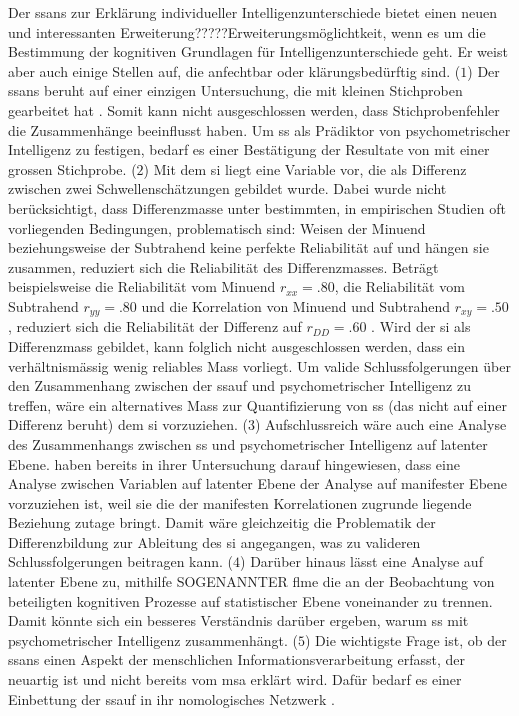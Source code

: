 \documentclass[11pt, twoside, a4paper]{book}		%
\begin{document}
Der \gls{ssans} zur Erklärung individueller Intelligenzunterschiede \citep{Melnick2013} bietet einen neuen und interessanten Erweiterung?????Erweiterungsmöglichtkeit, wenn es um die Bestimmung der kognitiven Grundlagen für Intelligenzunterschiede geht. Er weist aber auch einige Stellen auf, die anfechtbar oder klärungsbedürftig sind.
($1$) Der \gls{ssans} beruht auf einer einzigen Untersuchung, die mit kleinen Stichproben gearbeitet hat \citep[Studie 1: $N=12$ und Studie 2: $N=53$;][]{Melnick2013}. Somit kann nicht ausgeschlossen werden, dass Stichprobenfehler die Zusammenhänge beeinflusst haben. Um \gls{ss} als Prädiktor von psychometrischer Intelligenz zu festigen, bedarf es einer Bestätigung der Resultate von \citet{Melnick2013} mit einer grossen Stichprobe.
($2$) Mit dem \gls{si} liegt eine Variable vor, die als Differenz zwischen zwei Schwellenschätzungen gebildet wurde. Dabei wurde nicht berücksichtigt, dass Differenzmasse unter bestimmten, in empirischen Studien oft vorliegenden Bedingungen, problematisch sind: Weisen der Minuend  beziehungsweise der Subtrahend keine perfekte Reliabilität auf und hängen sie zusammen, reduziert sich die Reliabilität des Differenzmasses. Beträgt beispielsweise die Reliabilität vom Minuend $r_{xx} = .80$, die Reliabilität vom Subtrahend $r_{yy} = .80$ und die Korrelation von Minuend und Subtrahend $r_{xy} = .50$, reduziert sich die Reliabilität der Differenz auf $r_{DD} = .60$ \citep[][S. 145]{Murphy2005}. Wird der \gls{si} als Differenzmass gebildet, kann folglich nicht ausgeschlossen werden, dass ein verhältnismässig wenig reliables Mass vorliegt. Um valide Schlussfolgerungen über den Zusammenhang zwischen der \gls{ssauf} und psychometrischer Intelligenz zu treffen, wäre ein alternatives Mass zur Quantifizierung von \gls{ss} (das nicht auf einer Differenz beruht) dem \gls{si} vorzuziehen.
($3$) Aufschlussreich wäre auch eine Analyse des Zusammenhangs zwischen \gls{ss} und psychometrischer Intelligenz auf latenter Ebene. \citet{Melnick2013} haben bereits in ihrer Untersuchung darauf hingewiesen, dass eine Analyse zwischen Variablen auf latenter Ebene der Analyse auf manifester Ebene vorzuziehen ist, weil sie die der manifesten Korrelationen zugrunde liegende Beziehung zutage bringt. Damit wäre gleichzeitig die Problematik der Differenzbildung zur Ableitung des \gls{si} angegangen, was zu valideren Schlussfolgerungen beitragen kann.
($4$) Darüber hinaus lässt eine Analyse auf latenter Ebene zu, mithilfe SOGENANNTER \gls{flm}e \citep[][]{Schweizer2006a, Schweizer2006b} die an der Beobachtung von \citeauthor{Melnick2013} beteiligten kognitiven Prozesse auf statistischer Ebene voneinander zu trennen. Damit könnte sich ein besseres Verständnis darüber ergeben, warum \gls{ss} mit psychometrischer Intelligenz zusammenhängt.
($5$) Die wichtigste Frage ist, ob der \gls{ssans} einen Aspekt der menschlichen Informationsverarbeitung erfasst, der neuartig ist und nicht bereits vom \gls{msa} erklärt wird. Dafür bedarf es einer Einbettung der \gls{ssauf} in ihr nomologisches Netzwerk \citep{Cronbach1955}.
\end{document}
